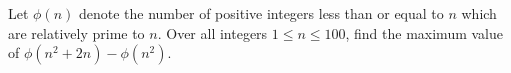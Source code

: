 Let $\phi(n)$ denote the number of positive integers less than or equal to $n$ which are relatively prime to $n$. Over all integers $1\le n \le 100$, find the maximum value of $\phi(n^2+2n)-\phi(n^2)$.
